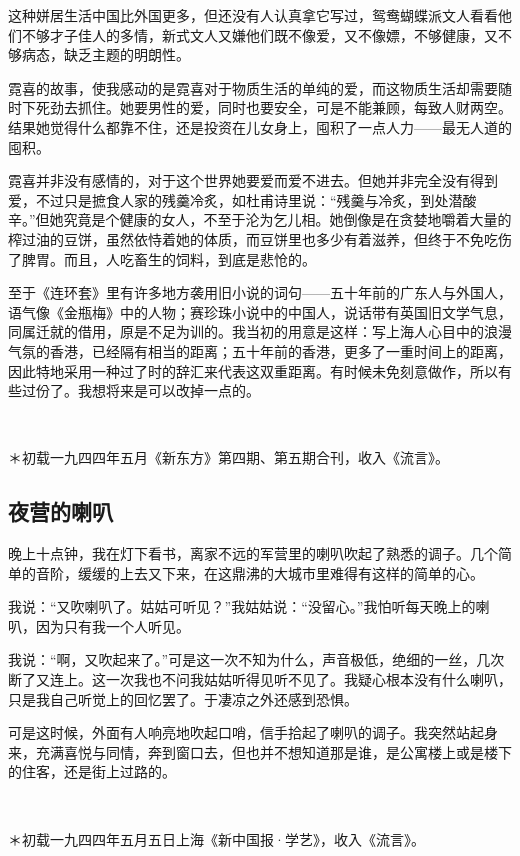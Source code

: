 \par 这种姘居生活中国比外国更多，但还没有人认真拿它写过，鸳鸯蝴蝶派文人看看他们不够才子佳人的多情，新式文人又嫌他们既不像爱，又不像嫖，不够健康，又不够病态，缺乏主题的明朗性。
\par 霓喜的故事，使我感动的是霓喜对于物质生活的单纯的爱，而这物质生活却需要随时下死劲去抓住。她要男性的爱，同时也要安全，可是不能兼顾，每致人财两空。结果她觉得什么都靠不住，还是投资在儿女身上，囤积了一点人力——最无人道的囤积。
\par 霓喜并非没有感情的，对于这个世界她要爱而爱不进去。但她并非完全没有得到爱，不过只是摭食人家的残羹冷炙，如杜甫诗里说：“残羹与冷炙，到处潜酸辛。”但她究竟是个健康的女人，不至于沦为乞儿相。她倒像是在贪婪地嚼着大量的榨过油的豆饼，虽然依恃着她的体质，而豆饼里也多少有着滋养，但终于不免吃伤了脾胃。而且，人吃畜生的饲料，到底是悲怆的。
\par 至于《连环套》里有许多地方袭用旧小说的词句——五十年前的广东人与外国人，语气像《金瓶梅》中的人物；赛珍珠小说中的中国人，说话带有英国旧文学气息，同属迁就的借用，原是不足为训的。我当初的用意是这样：写上海人心目中的浪漫气氛的香港，已经隔有相当的距离；五十年前的香港，更多了一重时间上的距离，因此特地采用一种过了时的辞汇来代表这双重距离。有时候未免刻意做作，所以有些过份了。我想将来是可以改掉一点的。
\par  
\par ＊初载一九四四年五月《新东方》第四期、第五期合刊，收入《流言》。


\subsection{夜营的喇叭}

\par 晚上十点钟，我在灯下看书，离家不远的军营里的喇叭吹起了熟悉的调子。几个简单的音阶，缓缓的上去又下来，在这鼎沸的大城市里难得有这样的简单的心。
\par 我说：“又吹喇叭了。姑姑可听见？”我姑姑说：“没留心。”我怕听每天晚上的喇叭，因为只有我一个人听见。
\par 我说：“啊，又吹起来了。”可是这一次不知为什么，声音极低，绝细的一丝，几次断了又连上。这一次我也不问我姑姑听得见听不见了。我疑心根本没有什么喇叭，只是我自己听觉上的回忆罢了。于凄凉之外还感到恐惧。
\par 可是这时候，外面有人响亮地吹起口哨，信手拾起了喇叭的调子。我突然站起身来，充满喜悦与同情，奔到窗口去，但也并不想知道那是谁，是公寓楼上或是楼下的住客，还是街上过路的。
\par  
\par ＊初载一九四四年五月五日上海《新中国报·学艺》，收入《流言》。


